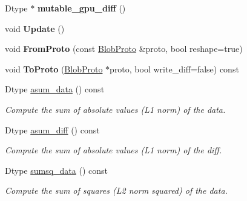 \begin{DoxyCompactItemize}
\item 
\mbox{\label{classcaffe_1_1_blob_a620355177a31dc8a813253b0ff5a65d6}} 
Dtype $\ast$ {\bfseries mutable\+\_\+gpu\+\_\+diff} ()
\item 
\mbox{\label{classcaffe_1_1_blob_afe035d7b60c56e4aed2a18296e8ffdc5}} 
void {\bfseries Update} ()
\item 
\mbox{\label{classcaffe_1_1_blob_a0a95f882414ba0a11d674b134478476d}} 
void {\bfseries From\+Proto} (const \mbox{\hyperlink{classcaffe_1_1_blob_proto}{Blob\+Proto}} \&proto, bool reshape=true)
\item 
\mbox{\label{classcaffe_1_1_blob_adec156c0682f12c5bf0a3bf221c1a023}} 
void {\bfseries To\+Proto} (\mbox{\hyperlink{classcaffe_1_1_blob_proto}{Blob\+Proto}} $\ast$proto, bool write\+\_\+diff=false) const
\item 
\mbox{\label{classcaffe_1_1_blob_aa06094adb9337a7d67f7049a1f2ede54}} 
Dtype \mbox{\hyperlink{classcaffe_1_1_blob_aa06094adb9337a7d67f7049a1f2ede54}{asum\+\_\+data}} () const
\begin{DoxyCompactList}\small\item\em Compute the sum of absolute values (L1 norm) of the data. \end{DoxyCompactList}\item 
\mbox{\label{classcaffe_1_1_blob_a1bf366edeb71ae6a76d4177fef3879ec}} 
Dtype \mbox{\hyperlink{classcaffe_1_1_blob_a1bf366edeb71ae6a76d4177fef3879ec}{asum\+\_\+diff}} () const
\begin{DoxyCompactList}\small\item\em Compute the sum of absolute values (L1 norm) of the diff. \end{DoxyCompactList}\item 
\mbox{\label{classcaffe_1_1_blob_a2ea640466fc339a02dabba4e8a1f0de2}} 
Dtype \mbox{\hyperlink{classcaffe_1_1_blob_a2ea640466fc339a02dabba4e8a1f0de2}{sumsq\+\_\+data}} () const
\begin{DoxyCompactList}\small\item\em Compute the sum of squares (L2 norm squared) of the data. \end{DoxyCompactList}\item 

\end{DoxyCompactItemize}
